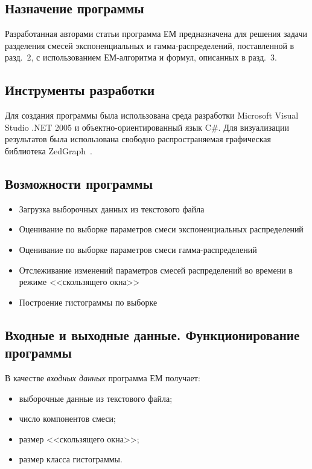 \begin{multicols}{2}
\subsection{Назначение программы} %

Разработанная авторами статьи программа ЕМ предназначена для решения задачи
разделения смесей экспоненциальных и гамма-распределений, поставленной в
разд.~2, с использованием ЕМ-ал\-го\-рит\-ма и формул, описанных в разд.~3.

\subsection{Инструменты разработки} %

Для создания программы была использована среда разработки Microsoft
Visual Studio .NET 2005 и объектно-ориентированный язык C\#. Для
визуализации результатов была использована свободно распространяемая
графическая библиотека ZedGraph~\cite{7bat}.


\subsection{Возможности  программы} %

\noindent
\begin{itemize}
\item Загрузка выборочных данных из текстового файла
\item Оценивание по выборке параметров смеси экспоненциальных
распределений
\item Оценивание по выборке параметров смеси гамма-распределений
\item Отслеживание изменений параметров смесей распределений во
времени в режиме <<скользящего окна>>
\item Построение гистограммы по выборке
\end{itemize}

\subsection{Входные и выходные данные. Функционирование
программы} %

В качестве \textit{входных данных} программа ЕМ получает:
\begin{itemize}
\item выборочные данные из текстового файла;
\item число компонентов смеси;
\item размер <<скользящего окна>>;
\item размер класса гистограммы.
\end{itemize}


\end{multicols}
